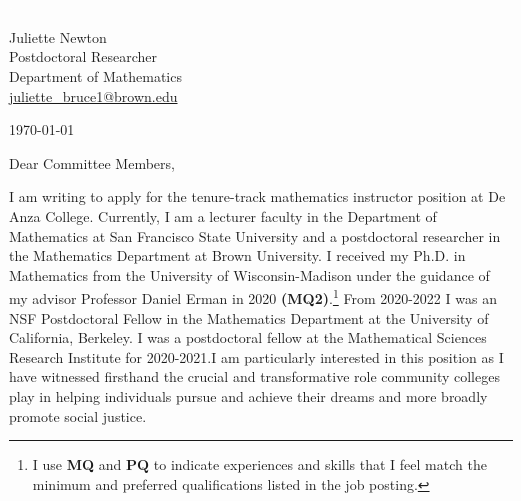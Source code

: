 \documentclass[11pt]{article}
\begin{document}
\section*{}

\noindent
\begin{minipage}{0.99\textwidth}
\begin{minipage}{0.69\textwidth}
\textcolor{white}{.}
\end{minipage}
\begin{minipage}{0.29\textwidth}
{
Juliette Newton \\
Postdoctoral Researcher \\
Department of Mathematics \\
\href{mailto:juliette\_bruce1@brown.edu}{juliette\_bruce1@brown.edu}
}

\vspace{12pt}
\today
\end{minipage}
\end{minipage}


\vspace{12pt}
\noindent
Dear Committee Members,

I am writing to apply for the tenure-track mathematics instructor position at De Anza College. Currently, I am a lecturer faculty in the Department of Mathematics at San Francisco State University and a postdoctoral researcher in the Mathematics Department at Brown University. I received my Ph.D. in Mathematics from the University of Wisconsin-Madison under the guidance of my advisor Professor Daniel Erman in 2020 \textbf{(MQ2)}.\footnote{I use \textbf{MQ} and $\textbf{PQ}$ to indicate experiences and skills that I feel match the minimum and preferred qualifications listed in the job posting.}  From 2020-2022 I was an NSF Postdoctoral Fellow in the Mathematics Department at the University of California, Berkeley. I was a postdoctoral fellow at the Mathematical Sciences Research Institute for 2020-2021.I am particularly interested in this position as I have witnessed firsthand the crucial and transformative role community colleges play in helping individuals pursue and achieve their dreams and more broadly promote social justice. 
\end{document}
